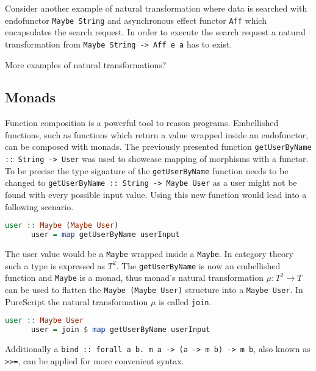 \documentclass[article]{aaltoseries}
\begin{document}
    Consider another example of natural transformation where data is searched
    with endofunctor \lstinline|Maybe String| and asynchronous effect functor
    \lstinline|Aff| which encapsulates the search request. In order to execute
    the search request a natural transformation from
    \lstinline|Maybe String -> Aff e a| has to exist.

More examples of natural transformations?


  \subsection{Monads}
    Function composition is a powerful tool to reason programs. Embellished
    functions, such as functions which return a value wrapped inside an
    endofunctor, can be composed with monads. The previously presented function
    \lstinline|getUserByName :: String -> User| was used to showcase mapping of
    morphisms with a functor. To be precise the type signature of the
    \lstinline|getUserByName| function needs to be changed to
    \lstinline|getUserByName :: String -> Maybe User| as a user might not be
    found with every possible input value. Using this new function would lead
    into a following scenario.
 
    \begin{lstlisting}[language=Haskell]
      user :: Maybe (Maybe User)
      user = map getUserByName userInput
    \end{lstlisting}
 
    The user value would be a \lstinline|Maybe| wrapped inside a
    \lstinline|Maybe|. In category theory such a type is expressed as $T^2$. The
    \lstinline|getUserByName| is now an embellished function and
    \lstinline|Maybe| is a monad, thus monad’s natural transformation $\mu : T^2
    \rightarrow T$ can be used to flatten the \lstinline|Maybe (Maybe User)|
    structure into a \lstinline|Maybe User|. In PureScript the natural
    transformation $\mu$ is called \lstinline|join|.
 
    \begin{lstlisting}[language=Haskell]
      user :: Maybe User
      user = join $ map getUserByName userInput
    \end{lstlisting}
 
    Additionally a \lstinline|bind :: forall a b. m a -> (a -> m b) -> m b|,
    also known as \lstinline|>>=|, can be applied for more convenient syntax.
 
\end{document}
